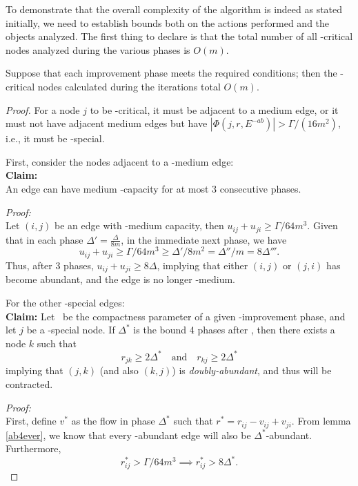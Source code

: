 To demonstrate that the overall complexity of the algorithm is indeed as stated initially, we need to establish bounds both on the actions performed and the objects analyzed. The first thing to declare is that the total number of all \gmm-critical nodes analyzed during the various phases is \( O(m) \).

\begin{theorem}
    \label{maxM}
    Suppose that each improvement phase meets the required conditions; then the \gmm-critical nodes calculated during the iterations total \( O(m) \).
\end{theorem}

\begin{proof}
    For a node \( j \) to be \gmm-critical, it must be adjacent to a \gmm medium edge, or it must not have adjacent \gmm medium edges but have \( |\Phi (j, r, E^{-ab})| > \Gamma/(16m^2) \), i.e., it must be \gmm-special.

    First, consider the nodes adjacent to a \gmm-medium edge:\\
    \textbf{Claim:}\\
    An edge can have medium \gmm-capacity for at most 3 consecutive phases.

    \textit{Proof:}\\
    Let \( (i,j) \) be an edge with \gmm-medium capacity, then \( u_{ij} + u_{ji} \ge \Gamma/64m^3 \). Given that in each phase \( \Delta' = \frac{\Delta}{8m} \), in the immediate next phase, we have 
    \[
    u_{ij} + u_{ji} \ge \Gamma/64m^3 \ge \Delta'/8m^2 = \Delta''/m = 8\Delta'''.
    \]
    Thus, after 3 phases, \( u_{ij} + u_{ji} \ge 8\Delta \), implying that either \( (i,j) \) or \( (j,i) \) has become abundant, and the edge is no longer \gmm-medium.

    For the other \gmm-special edges:\\
    \textbf{Claim:}
    Let \gmm\ be the compactness parameter of a given \dlt-improvement phase, and let \( j \) be a \gmm-special node. If \( \Delta^* \) is the bound 4 phases after \dlt, then there exists a node \( k \) such that 
    \[
    r_{jk} \ge 2\Delta^* \quad \text{and} \quad r_{kj} \ge 2\Delta^* 
    \]
    implying that \( (j,k) \) (and also \( (k,j) \)) is \textit{doubly-abundant}, and thus will be contracted.
    
    \textit{Proof:}\\
    First, define \( v^* \) as the flow in phase \( \Delta^* \) such that \( r^* = r_{ij}-v_{ij}+v_{ji} \). From lemma \ref{ab4ever}, we know that every \dlt-abundant edge will also be \( \Delta^* \)-abundant. Furthermore,
    \[
    r_{ij}^* > \Gamma/64m^3 \implies r_{ij}^* > 8\Delta^*.
    \]


\end{proof}
